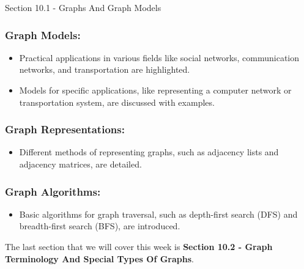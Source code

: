 \begin{notes}{Section 10.1 - Graphs And Graph Models}
    \subsubsection*{Graph Models:}

    \begin{itemize}
        \item Practical applications in various fields like social networks, communication networks, and transportation are highlighted.
        \item Models for specific applications, like representing a computer network or transportation system, are discussed with examples.
    \end{itemize}

    \subsubsection*{Graph Representations:}

    \begin{itemize}
        \item Different methods of representing graphs, such as adjacency lists and adjacency matrices, are detailed.
    \end{itemize}

    \subsubsection*{Graph Algorithms:}

    \begin{itemize}
        \item Basic algorithms for graph traversal, such as depth-first search (DFS) and breadth-first search (BFS), are introduced.
    \end{itemize}
\end{notes}

The last section that we will cover this week is \textbf{Section 10.2 - Graph Terminology And Special Types Of Graphs}.

